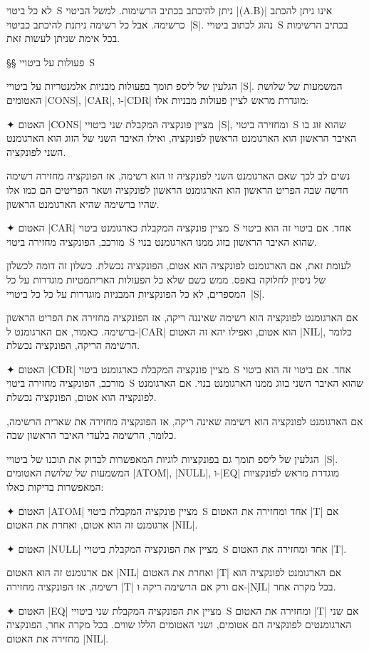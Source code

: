 לא כל ביטוי~S ניתן להיכתב בכתיב הרשימות. למשל הביטוי \T|(A.B)| אינו ניתן להכתב
כרשימה. אבל כל רשימה ניתנת להיכתב כביטוי~\E|S|. נהוג לכתוב ביטויי~S בכתיב
הרשימות בכל אימת שניתן לעשות זאת.

§§ פעולות על ביטויי~S

הגלעין של ליספ תומך בפעולות מבניות אלמנטריות על ביטויי \E|S|. המשמעות של שלושת
האטומים \T|CONS|, \T|CAR|, ו-\T|CDR| מוגדרת מראש לציין פעולות מבניות אלו:

\begin{enumerate}
  ✦ האטום \T|CONS| מציין פונקציה המקבלת שני ביטויי~\E|S|, ומחזירה ביטוי~S
  שהוא זוג בו האיבר הראשון הוא הארגומנט הראשון לפונקציה, ואילו האיבר השני של
  הזוג הוא הארגומנט השני לפונקציה.

  נשים לב לכך שאם הארגומנט השני לפונקציה זו הוא רשימה, אז הפונקציה מחזירה
  רשימה חדשה שבה הפריט הראשון הוא הארגומנט הראשון לפונקציה ושאר
  הפריטים הם כמו אלו שהיו ברשימה שהיא הארגומנט הראשון.

  ✦ האטום \T|CAR| מציין פונקציה המקבלת כארגומנט ביטוי~S אחד. אם ביטוי זה הוא
  ביטוי מורכב, הפונקציה מחזירה ביטוי~S שהוא האיבר הראשון בזוג ממנו הארגומנט
  בנוי.

  לעומת זאת, אם הארגומנט לפונקציה הוא אטום, הפונקציה נכשלת. כשלון זה דומה
  לכשלון של ניסיון לחלוקה באפס. ממש כשם שלא כל הפעולות האריתמטיות מוגדרות על כל
  המספרים, לא כל הפונקציות המבניות מוגדרות על כל כל ביטויי~\E|S|.

  אם הארגומנט לפונקציה הוא רשימה שאיננה ריקה, אז הפונקציה מחזירה את הפריט
  הראשון ברשימה. כאמור, אם הארגומנט ל-\E|CAR| הוא אטום, ואפילו יהא זה
  האטום \T|NIL|, כלומר הרשימה הריקה, הפונקציה נכשלת.

  ✦ האטום \T|CDR| מציין פונקציה המקבלת כארגומנט ביטוי~S אחד. אם ביטוי זה הוא
  ביטוי מורכב, הפונקציה מחזירה ביטוי~S שהוא האיבר השני בזוג ממנו הארגומנט בנוי.
  אם הארגומנט לפונקציה הוא אטום, הפונקציה נכשלת.

  אם הארגומנט לפונקציה הוא רשימה שאינה ריקה, אז הפונקציה מחזירה את
  שארית הרשימה, כלומר, הרשימה בלעדי האיבר הראשון שבה.
\end{enumerate}

הגלעין של ליספ תומך גם בפונקציות לוגיות המאפשרות לבדוק את תוכנו של
ביטויי~\E|S|. המשמעות של שלושת האטומים \T|ATOM|, \T|NULL|, ו-\T|EQ| מוגדרת
מראש לפונקציות המאפשרות בדיקות כאלו:

\begin{enumerate}
  ✦ האטום \T|ATOM| מציין פונקציה המקבלת ביטוי~S אחד ומחזירה את האטום \T|T| אם
  ארגומנט זה הוא אטום, ואחרת את האטום \T|NIL|.

  ✦ האטום \T|NULL| מציין את הפונקציה המקבלת ביטויי~S אחד ומחזירה את האטום
  \T|T|.

  אם ארגומנט זה הוא האטום \T|NIL| ואחרת את האטום \T|T| אם הארגומנט לפונקציה הוא
  רשימה, אז הפונקציה מחזירה \T|T| אם ורק אם הרשימה ריקה ו-\T|NִִIL| בכל
  מקרה אחר.

  ✦ האטום \T|EQ| מציין את הפונקציה המקבלת שני ביטויי~S ומחזירה את האטום \T|T|
  אם שני הארגומנטים לפונקציה הם אטומים, ושני האטומים הללו שווים. בכל מקרה אחר,
  הפונקציה מחזירה את האטום \T|NIL|.
\end{enumerate}


